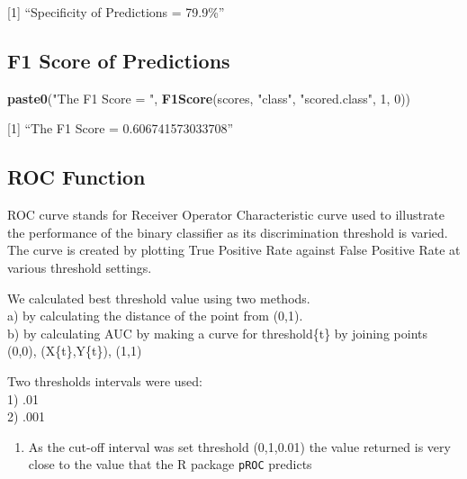 \documentclass[]{article}
\newenvironment{Shaded}{\begin{snugshade}}{\end{snugshade}}
\newcommand{\KeywordTok}[1]{\textcolor[rgb]{0.13,0.29,0.53}{\textbf{{#1}}}}
\newcommand{\DecValTok}[1]{\textcolor[rgb]{0.00,0.00,0.81}{{#1}}}
\newcommand{\StringTok}[1]{\textcolor[rgb]{0.31,0.60,0.02}{{#1}}}
\newcommand{\NormalTok}[1]{{#1}}
\providecommand{\tightlist}{%
  \setlength{\itemsep}{0pt}\setlength{\parskip}{0pt}}
\begin{document}
{[}1{]} ``Specificity of Predictions = 79.9\%''

\newpage

\subsection{F1 Score of Predictions}\label{f1-score-of-predictions-1}

\begin{Shaded}
\begin{Highlighting}[]
\KeywordTok{paste0}\NormalTok{(}\StringTok{"The F1 Score = "}\NormalTok{, }\KeywordTok{F1Score}\NormalTok{(scores, }\StringTok{"class"}\NormalTok{, }\StringTok{"scored.class"}\NormalTok{, }\DecValTok{1}\NormalTok{, }\DecValTok{0}\NormalTok{))}
\end{Highlighting}
\end{Shaded}

{[}1{]} ``The F1 Score = 0.606741573033708''

\subsection{ROC Function}\label{roc-function}

ROC curve stands for Receiver Operator Characteristic curve used to
illustrate the performance of the binary classifier as its
discrimination threshold is varied. The curve is created by plotting
True Positive Rate against False Positive Rate at various threshold
settings.

We calculated best threshold value using two methods.\\
a) by calculating the distance of the point from (0,1).\\
b) by calculating AUC by making a curve for threshold\{t\} by joining
points (0,0), (X\{t\},Y\{t\}), (1,1)

Two thresholds intervals were used:\\
1) .01\\
2) .001

\begin{enumerate}
\def\labelenumi{\arabic{enumi})}
\tightlist
\item
  As the cut-off interval was set threshold (0,1,0.01) the value
  returned is very close to the value that the R package \texttt{pROC}
  predicts
\end{enumerate}
\end{document}
